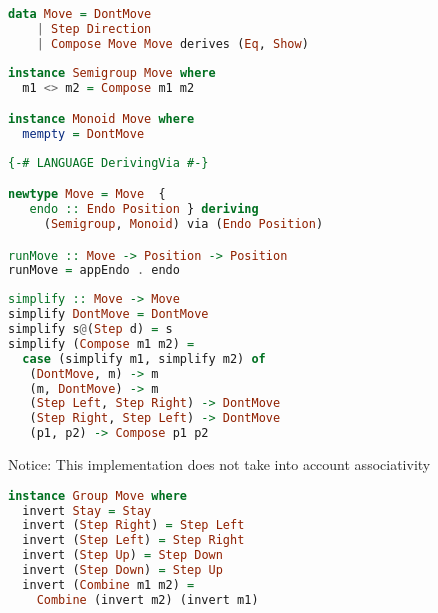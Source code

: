 \documentclass[10pt]{beamer}
\begin{document}
\begin{frame}[fragile]
\begin{lstlisting}[language=haskell, basicstyle=\ttfamily]
data Move = DontMove
    | Step Direction
    | Compose Move Move derives (Eq, Show)
  \end{lstlisting}
\end{frame}
\begin{frame}[fragile]
\begin{lstlisting}[language=haskell, basicstyle=\ttfamily]
instance Semigroup Move where
  m1 <> m2 = Compose m1 m2

instance Monoid Move where
  mempty = DontMove
\end{lstlisting}
\end{frame}
\begin{frame}[fragile]
\begin{lstlisting}[language=haskell, basicstyle=\ttfamily]
{-# LANGUAGE DerivingVia #-}

newtype Move = Move  {
   endo :: Endo Position } deriving
     (Semigroup, Monoid) via (Endo Position)

runMove :: Move -> Position -> Position
runMove = appEndo . endo

\end{lstlisting}
\end{frame}
\begin{frame}[fragile]
\begin{lstlisting}[language=haskell, basicstyle=\ttfamily]
simplify :: Move -> Move 
simplify DontMove = DontMove 
simplify s@(Step d) = s
simplify (Compose m1 m2) = 
  case (simplify m1, simplify m2) of 
   (DontMove, m) -> m 
   (m, DontMove) -> m 
   (Step Left, Step Right) -> DontMove
   (Step Right, Step Left) -> DontMove
   (p1, p2) -> Compose p1 p2
\end{lstlisting}

  Notice:  This implementation does not take into account associativity
\end{frame}


\begin{frame}[fragile]
\begin{lstlisting}[language=haskell, basicstyle=\ttfamily]
instance Group Move where
  invert Stay = Stay
  invert (Step Right) = Step Left
  invert (Step Left) = Step Right
  invert (Step Up) = Step Down
  invert (Step Down) = Step Up
  invert (Combine m1 m2) = 
    Combine (invert m2) (invert m1)
\end{lstlisting}
\end{frame}
\end{document}
